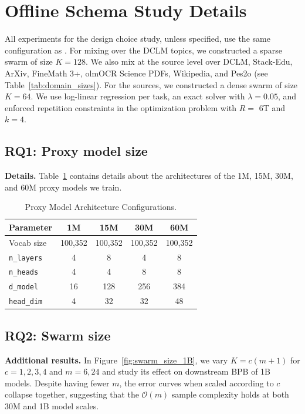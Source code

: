 

\section{Offline Schema Study Details}\label{supp:study_details}


All experiments for the design choice study, unless specified, use the same configuration as \base. For mixing over the DCLM topics, we constructed a sparse swarm of size $K = 128$.
We also mix at the source level over DCLM, Stack-Edu, ArXiv, FineMath 3+, olmOCR Science PDFs, Wikipedia, and Pes2o (see Table~\ref{tab:domain_sizes}). For the sources, we constructed a dense swarm of size $K = 64$. We use log-linear regression per task, an exact solver with $\lambda = 0.05$, and enforced repetition constraints in the optimization problem with $R =$ 6T and $k = 4$.


\subsection{RQ1: Proxy model size} 

\textbf{Details.} Table~\ref{tab:model_architectures} contains details about the architectures of the 1M, 15M, 30M, and 60M proxy models we train. 

\begin{table}[htb]
\centering
\caption{Proxy Model Architecture Configurations.}
\label{tab:model_architectures}
\begin{tabular}{lcccc}
\toprule
\textbf{Parameter} & \textbf{1M} & \textbf{15M} & \textbf{30M} & \textbf{60M} \\
\midrule
Vocab size & 100,352 & 100,352 & 100,352 & 100,352 \\
\texttt{n\_layers} & 4 & 8 & 4 & 8 \\
\texttt{n\_heads} & 4 & 4 & 8 & 8 \\
\texttt{d\_model} & 16 & 128 & 256 & 384 \\
\texttt{head\_dim} & 4 & 32 & 32 & 48 \\
\bottomrule
\end{tabular}
\end{table}


\subsection{RQ2: Swarm size} 

\textbf{Additional results.} In Figure~\ref{fig:swarm_size_1B}, we vary $K = c(m+1)$ for $c = 1, 2, 3, 4$ and $m=6, 24$ and study its effect on downstream BPB of 1B models. Despite having fewer $m$, the error curves when scaled according to $c$ collapse together, suggesting that the $\mathcal{O}(m)$ sample complexity holds at both 30M and 1B model scales. 

